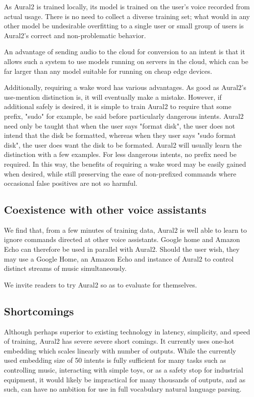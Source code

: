 \documentclass[conference]{IEEEtran}
\begin{document}
As Aural2 is trained locally, its model is trained on the user's voice recorded from actual usage.
There is no need to collect a diverse training set; what would in any other model be undesirable overfitting to a single user or small group of users is Aural2's correct and non-problematic behavior.

An advantage of sending audio to the cloud for conversion to an intent
is that it allows such a system to use models running on servers in the
cloud, which can be far larger than any model suitable for running on
cheap edge devices.

Additionally, requiring a wake word has various advantages.
As good as Aural2's use-mention distinction is, it will eventually make a mistake.
However, if additional safely is desired, it is simple to train Aural2
to require that some prefix, "sudo" for example, be said before particularly dangerous intents.
Aural2 need only be taught that when the user says "format disk", the user does not intend that the disk be formatted,
whereas when they user says "sudo format disk", the user does want the disk to be formated.
Aural2 will usually learn the distinction with a few examples.
For less dangerous intents, no prefix need be required.
In this way, the benefits of requiring a wake word may be easily gained when desired,
while still preserving the ease of non-prefixed commands where occasional false positives are not so harmful.

\subsection{Coexistence with other voice assistants}
We find that, from a few minutes of training data, Aural2 is well able to learn to ignore commands directed at other voice assistants.
Google home and Amazon Echo can therefore be used in parallel with Aural2.
Should the user wish, they may use a Google Home, an Amazon Echo and instance of Aural2 to control distinct streams of music simultaneously.

We invite readers to try Aural2 so as to evaluate for themselves.

\subsection{Shortcomings}
Although perhaps superior to existing technology in latency, simplicity,
and speed of training, Aural2 has severe severe short comings.
It currently uses one-hot embedding which scales linearly with number of outputs.
While the currently used embedding size of 50 intents is fully sufficient for many tasks such as controlling music, interacting with simple toys, or as a safety stop for industrial equipment, it would likely be impractical for many thousands of outputs, and as such, can have no ambition for use in full vocabulary natural language parsing.
\end{document}

